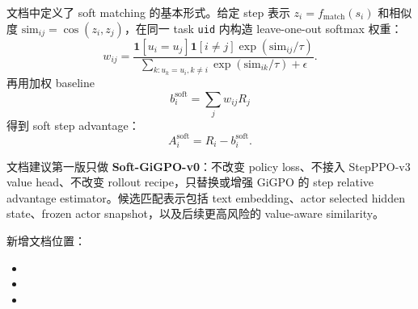 \documentclass[10pt]{ctexart}
\newcommand{\code}[1]{\texttt{#1}}
\begin{document}
文档中定义了 soft matching 的基本形式。给定 step 表示 $z_i=f_{\mathrm{match}}(s_i)$ 和相似度 $\mathrm{sim}_{ij}=\cos(z_i,z_j)$，在同一 task \code{uid} 内构造 leave-one-out softmax 权重：
\[
w_{ij}=\frac{\mathbf{1}[u_i=u_j]\mathbf{1}[i\ne j]\exp(\mathrm{sim}_{ij}/\tau)}
{\sum_{k:u_k=u_i,k\ne i}\exp(\mathrm{sim}_{ik}/\tau)+\epsilon}.
\]
再用加权 baseline
\[
b_i^{\mathrm{soft}}=\sum_j w_{ij}R_j
\]
得到 soft step advantage：
\[
A_i^{\mathrm{soft}}=R_i-b_i^{\mathrm{soft}}.
\]

文档建议第一版只做 \textbf{Soft-GiGPO-v0}：不改变 policy loss、不接入 StepPPO-v3 value head、不改变 rollout recipe，只替换或增强 GiGPO 的 step relative advantage estimator。候选匹配表示包括 text embedding、actor selected hidden state、frozen actor snapshot，以及后续更高风险的 value-aware similarity。

新增文档位置：
\begin{itemize}
  \item {}
  \item {}
  \item {}
\end{itemize}
\end{document}
